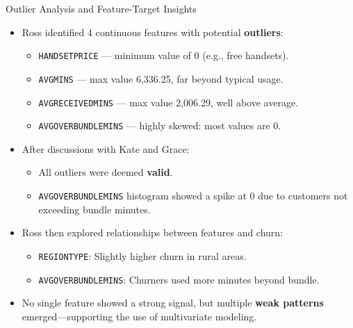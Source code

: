 \documentclass[aspectratio=169,xcolor=dvipsnames]{beamer}
\begin{document}
\begin{frame}{Outlier Analysis and Feature-Target Insights}

\begin{itemize}
  \item Ross identified 4 continuous features with potential \textbf{outliers}:
  \begin{itemize}
    \item \texttt{HANDSETPRICE} — minimum value of 0 (e.g., free handsets).
    \item \texttt{AVGMINS} — max value 6,336.25, far beyond typical usage.
    \item \texttt{AVGRECEIVEDMINS} — max value 2,006.29, well above average.
    \item \texttt{AVGOVERBUNDLEMINS} — highly skewed: most values are 0.
  \end{itemize}

  \item After discussions with Kate and Grace:
  \begin{itemize}
    \item All outliers were deemed \textbf{valid}.
    \item \texttt{AVGOVERBUNDLEMINS} histogram showed a spike at 0 due to customers not exceeding bundle minutes.
  \end{itemize}

  \item Ross then explored relationships between features and churn:
  \begin{itemize}
    \item \texttt{REGIONTYPE}: Slightly higher churn in rural areas.
    \item \texttt{AVGOVERBUNDLEMINS}: Churners used more minutes beyond bundle.
  \end{itemize}
  
  \item No single feature showed a strong signal, but multiple \textbf{weak patterns} emerged—supporting the use of multivariate modeling.
\end{itemize}

\end{frame}
\end{document}
